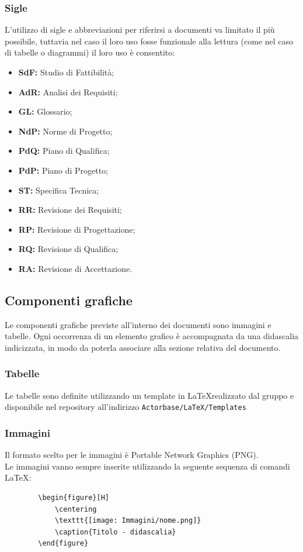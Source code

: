 \documentclass[a4paper]{report}
\begin{document}
	\subsubsection{Sigle}
	L'utilizzo di sigle e abbreviazioni per riferirsi a documenti va limitato il più possibile, tuttavia nel caso il loro uso
	fosse funzionale alla lettura (come nel caso di tabelle o diagrammi) il loro uso è consentito:
	\begin{itemize}
		\item \textbf{SdF:} Studio di Fattibilità;
		\item \textbf{AdR:} Analisi dei Requisiti;
		\item \textbf{GL:} Glossario;
		\item \textbf{NdP:} Norme di Progetto;
		\item \textbf{PdQ:} Piano di Qualifica;
		\item \textbf{PdP:} Piano di Progetto;
		\item \textbf{ST:} Specifica Tecnica;
		\item \textbf{RR:} Revisione dei Requisiti;
		\item \textbf{RP:} Revisione di Progettazione;
		\item \textbf{RQ:} Revisione di Qualifica;
		\item \textbf{RA:} Revisione di Accettazione.
	\end{itemize}
	\subsection{Componenti grafiche}
	Le componenti grafiche previste all'interno dei documenti sono immagini e tabelle. Ogni occorrenza di un
	elemento grafico è accompagnata da una didascalia indicizzata, in modo da poterla associare alla sezione 
	relativa del documento. 
	\subsubsection{Tabelle}
	Le tabelle sono definite utilizzando un template in \LaTeX \space realizzato dal gruppo e disponibile nel 
	repository all'indirizzo \verb|Actorbase/LaTeX/Templates| 
	\subsubsection{Immagini}
	Il formato scelto per le immagini è Portable Network Graphics (PNG). \\
	Le immagini vanno sempre inserite utilizzando la seguente sequenza di comandi \LaTeX:
	\begin{verbatim}
		\begin{figure}[H]
			\centering
			\texttt{[image: Immagini/nome.png]}
			\caption{Titolo - didascalia}
		\end{figure}
	\end{verbatim}
\end{document}

